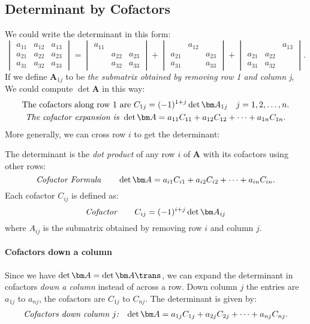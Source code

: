 \subsection{Determinant by Cofactors}
We could write the determinant in this form:
\[
\begin{vmatrix}
a_{11}&a_{12}&a_{13}\\a_{21}&a_{22}&a_{23}\\a_{31}&a_{32}&a_{33}
\end{vmatrix}=
\begin{vmatrix}
a_{11}&&\\&a_{22}&a_{23}\\&a_{32}&a_{33}
\end{vmatrix}+
\begin{vmatrix}
&a_{12}&\\a_{21}&&a_{23}\\a_{31}&&a_{33}
\end{vmatrix}+
\begin{vmatrix}
&&a_{13}\\a_{21}&a_{22}&\\a_{31}&a_{32}&
\end{vmatrix}.
\]
If we define $\bm A_{1j}$ to be \emph{the submatrix obtained by removing row 1 and column j}, We could compute $\det\bm A$ in this way:
\begin{gather*}
\text{The cofactors along row 1 are } C_{1j}=(-1)^{1+j}\det\bm A_{1j}\quad j=1,2,\dots,n.\\
\text{\emph{The cofactor expansion is }} \det\bm A=a_{11}C_{11}+a_{12}C_{12}+\dots+a_{1n}C_{1n}.
\end{gather*}
More generally, we can cross row $i$ to get the determinant:
\begin{definition}[Determinant]
The determinant is the \emph{dot product} of any row $i$ of $\bm A$ with its cofactors using other rows:
\[
\text{\emph{Cofactor Formula}}\qquad\det\bm A=
a_{i1}C_{i1}+a_{i2}C_{i2}+\dots+a_{in}C_{in}.
\]
Each cofactor $C_{ij}$ is defined as:
\[
\text{\emph{Cofactor}}\qquad C_{ij}=(-1)^{i+j}\det\bm A_{ij}
\]
where $A_{ij}$ is the submatrix obtained by removing row $i$ and column $j$.
\end{definition}

\paragraph{Cofactors down a column} Since we have $\det\bm A=\det\bm A\trans$, we can expand the determinant in cofactors \textit{down a column} instead of across a row. Down column $j$ the entries are $a_{1j}$ to $a_{nj}$, the cofactors are $C_{1j}$ to $C_{nj}$. The determinant is given by:
\[
\begin{array}{ll}
\mbox{\emph{Cofactors down column $j$:}}
&
\det\bm A=a_{1j}C_{1j}+a_{2j}C_{2j}+\dots+a_{nj}C_{nj}.
\end{array}
\]
